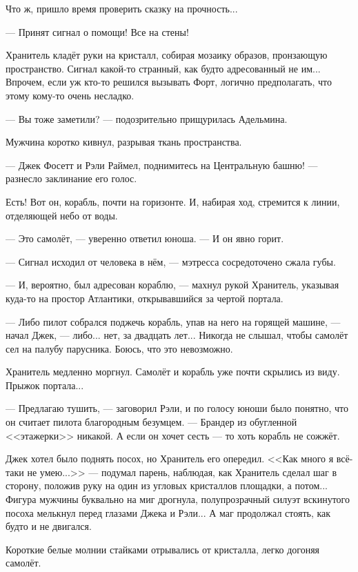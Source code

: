 Что ж, пришло время проверить сказку на прочность...

\emptypar

--- Принят сигнал о помощи! Все на стены!

Хранитель кладёт руки на кристалл, собирая мозаику образов, пронзающую пространство.
Сигнал какой-то странный, как будто адресованный не им...
Впрочем, если уж кто-то решился вызывать Форт, логично предполагать, что этому кому-то очень несладко.

--- Вы тоже заметили? --- подозрительно прищурилась Адельмина.

Мужчина коротко кивнул, разрывая ткань пространства.

--- Джек Фосетт и Рэли Раймел, поднимитесь на Центральную башню! --- разнесло заклинание его голос.

\emptypar

Есть! Вот он, корабль, почти на горизонте. И, набирая ход, стремится к линии, отделяющей небо от воды.


--- Это самолёт, --- уверенно ответил юноша. --- И он явно горит.

--- Сигнал исходил от человека в нём, --- мэтресса сосредоточено сжала губы.

--- И, вероятно, был адресован кораблю, --- махнул рукой Хранитель, указывая куда-то на простор Атлантики,
открывавшийся за чертой портала.

--- Либо пилот собрался поджечь корабль, упав на него на горящей машине, --- начал Джек,
--- либо... нет, за двадцать лет... Никогда не слышал, чтобы самолёт сел на палубу парусника. Боюсь, что это невозможно.

Хранитель медленно моргнул. Самолёт и корабль уже почти скрылись из виду. Прыжок портала...

--- Предлагаю тушить, --- заговорил Рэли, и по голосу юноши было понятно, что он считает пилота благородным безумцем.
--- Брандер из обугленной <<этажерки>> никакой. А если он хочет сесть --- то хоть корабль не сожжёт.

Джек хотел было поднять посох, но Хранитель его опередил.
<<Как много я всё-таки не умею...>> --- подумал парень, наблюдая, как Хранитель сделал шаг в сторону,
положив руку на один из угловых кристаллов площадки, а потом...
Фигура мужчины буквально на миг дрогнула, полупрозрачный силуэт вскинутого посоха мелькнул перед глазами Джека и Рэли...
А маг продолжал стоять, как будто и не двигался.

Короткие белые молнии стайками отрывались от кристалла, легко догоняя самолёт.

